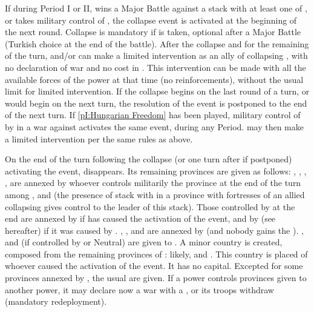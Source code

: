 

\activation{}
\aparag If during Period I or II, \TUR wins a Major Battle against a stack
with at least one \ARMY of \paysHongrie, or takes military control of
\provinceHongrie, the collapse event is activated at the beginning of the next
round.  Collapse is mandatory if \villeBuda is taken, optional after a Major
Battle (Turkish choice at the end of the battle).
\bparag After the collapse and for the remaining of the turn, \HAB and/or \POL
can make a limited intervention as an ally of collapsing \paysHongrie, with no
declaration of war and no cost in \STAB. This intervention can be made with
all the available forces of the power at that time (no reinforcements),
without the usual limit for limited intervention.
\bparag If the collapse begins on the last round of a turn, or would begin on
the next turn, the resolution of the event is postponed to the end of the next
turn.
\aparag If \ref{pI:Hungarian Freedom} has been played, military control of
\villeBuda by \HAB in a war against \paysHongrie activates the same event,
during any Period.
\bparag \TUR may then make a limited intervention per the same rules as above.

\phevnt
\aparag On the end of the turn following the collapse (or one turn after if
postponed) activating the event, \paysHongrie disappears.
\aparag Its remaining provinces are given as follows:
\bparag \provincePecs, \provinceCroatie, \provinceHongrie, \provinceKarpatok,
\provinceBukovina are annexed by whoever controls militarily the province at
the end of the turn among \TUR, \hab and \POL (the presence of stack with
\ARMY\faceplus in a province with fortresses of an allied collapsing
\paysHongrie gives control to the leader of this stack).  Those controlled by
\paysHongrie at the end are annexed by \HAB if \TUR has caused the activation
of the event, and by \paysTransylvanie (see hereafter) if it was caused by
\HAB.
\bparag \provinceSzlovakia, \provinceBalaton, \provinceKranj and
\provinceKapela are annexed by \HAB (and nobody gains the \VP).
\bparag \provinceBanat, \provinceSerbia and \provinceBosnia (if controlled by
\paysHongrie or Neutral) are given to \TUR.
\bparag A minor country \paysTransylvanie is created, composed from the
remaining provinces of \paysHongrie: likely, \provinceErdely and
\provinceMures. This country is placed \VASSAL of whoever caused the
activation of the event. It has no capital.
\bparag Excepted for some provinces annexed by \HAB, the usual \VP are given.
\aparag If a power controls provinces given to another power, it may declare
now a war with a \CB, or its troops withdraw (mandatory redeployment).

